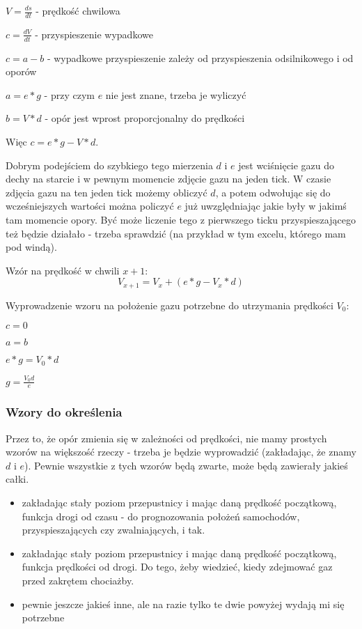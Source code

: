 \documentclass[12pt]{article}
\begin{document}
$V = \frac{ds}{dt}$ - prędkość chwilowa

$c = \frac{dV}{dt}$ - przyspieszenie wypadkowe

$c = a - b$ - wypadkowe przyspieszenie zależy od przyspieszenia odsilnikowego i od oporów

$a = e * g$ - przy czym $e$ nie jest znane, trzeba je wyliczyć

$b = V * d$ - opór jest wprost proporcjonalny do prędkości

Więc $c = e*g - V*d$. 

Dobrym podejściem do szybkiego tego mierzenia $d$ i $e$ jest wciśnięcie gazu do dechy na starcie i w pewnym momencie zdjęcie gazu na jeden tick. W czasie zdjęcia gazu na ten jeden tick możemy obliczyć $d$, a potem odwołując się do wcześniejszych wartości można policzyć $e$ już uwzględniając jakie były w jakimś tam momencie opory. Być może liczenie tego z pierwszego ticku przyspieszającego też będzie działało - trzeba sprawdzić (na przykład w tym excelu, którego mam pod windą).

Wzór na prędkość w chwili $x+1$: $$V_{x+1} = V_{x} + (e * g - V_x * d)$$

Wyprowadzenie wzoru na położenie gazu potrzebne do utrzymania prędkości $V_0$: 

$c=0$

$a=b$

$e * g = V_0 * d$

$g = \frac{V_0d}{e}$

\subsubsection{Wzory do określenia}
Przez to, że opór zmienia się w zależności od prędkości, nie mamy prostych wzorów na większość rzeczy - trzeba je będzie wyprowadzić (zakładając, że znamy $d$ i $e$). Pewnie wszystkie z tych wzorów będą zwarte, może będą zawierały jakieś całki.

\begin{itemize}
 \item zakładając stały poziom przepustnicy i mając daną prędkość początkową, funkcja drogi od czasu - do prognozowania położeń samochodów, przyspieszających czy zwalniających, i tak.
 \item zakładając stały poziom przepustnicy i mając daną prędkość początkową, funkcja prędkości od drogi. Do tego, żeby wiedzieć, kiedy zdejmować gaz przed zakrętem chociażby.
 \item pewnie jeszcze jakieś inne, ale na razie tylko te dwie powyżej wydają mi się potrzebne
\end{itemize}
\end{document}
